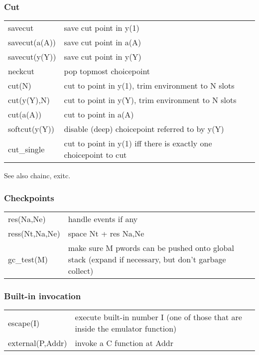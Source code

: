 \subsubsection{Cut}

\begin{tabular}{|l|l|}
\hline
savecut         & save cut point in y(1)                  \\
savecut(a(A))   & save cut point in a(A)                          \\
savecut(y(Y))   & save cut point in y(Y)                          \\
neckcut         & pop topmost choicepoint                 \\
cut(N)          & cut to point in y(1), trim environment to N slots       \\
cut(y(Y),N)     & cut to point in y(Y), trim environment to N slots       \\
cut(a(A))       & cut to point in a(A)                    \\
softcut(y(Y))   & disable (deep) choicepoint referred to by y(Y)          \\
cut_single      & cut to point in y(1) iff there is exactly one choicepoint to cut        \\
\hline
\end{tabular}

See also chainc, exitc.

\subsubsection{Checkpoints}

\begin{tabular}{|l|p{10cm}|}
\hline
res(Na,Ne)      & handle events if any                    \\
ress(Nt,Na,Ne)  & space Nt + res Na,Ne                    \\
gc_test(M)      & make sure M pwords can be pushed onto global stack
                 (expand if necessary, but don't garbage collect)\\
\hline
\end{tabular}

\subsubsection{Built-in invocation}

\begin{tabular}{|l|l|}
\hline
escape(I)               & execute built-in number I (one of those
                        that are inside the emulator function)\\
external(P,Addr)        & invoke a C function at Addr             \\
\hline
\end{tabular}

